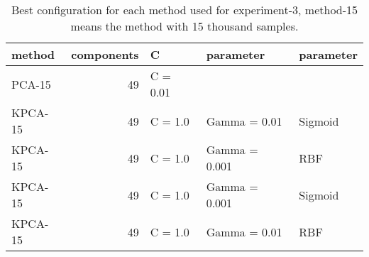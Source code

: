 \begin{table}
    \centering
    \begin{tabular}{lrlll}
        \toprule
        method & components & C & parameter & parameter\\
        \midrule
        PCA-15 & 49 & C = 0.01 &  \\
        KPCA-15 & 49 & C = 1.0 & Gamma = 0.01 & Sigmoid \\
        KPCA-15 & 49 & C = 1.0 & Gamma = 0.001 & RBF \\
        KPCA-15 & 49 & C = 1.0 & Gamma = 0.001 & Sigmoid \\
        KPCA-15 & 49 & C = 1.0 & Gamma = 0.01 & RBF \\
        \bottomrule
    \end{tabular}
    \caption{Best configuration for each method used for experiment-3, method-15 means the method with 15 thousand samples.}
    \label{tab:best-configuration-expr-3}
\end{table}